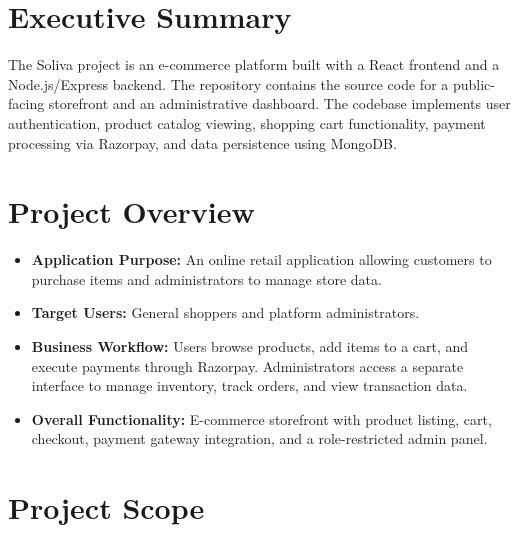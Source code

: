 \documentclass[11pt,a4paper]{article}
\begin{document}
\newpage

\tableofcontents
\newpage

\section{Executive Summary}
The Soliva project is an e-commerce platform built with a React frontend and a
Node.js/Express backend. The repository contains the source code for a
public-facing storefront and an administrative dashboard. The codebase
implements user authentication, product catalog viewing, shopping cart
functionality, payment processing via Razorpay, and data persistence using
MongoDB.

\section{Project Overview}
\begin{itemize}[leftmargin=*]
    \item \textbf{Application Purpose:} An online retail application allowing
          customers to purchase items and administrators to manage store data.
    \item \textbf{Target Users:} General shoppers and platform administrators.
    \item \textbf{Business Workflow:} Users browse products, add items to a
          cart, and execute payments through Razorpay. Administrators access a
          separate interface to manage inventory, track orders, and view
          transaction data.
    \item \textbf{Overall Functionality:} E-commerce storefront with product
          listing, cart, checkout, payment gateway integration, and a
          role-restricted admin panel.
\end{itemize}

\section{Project Scope}
\end{document}
